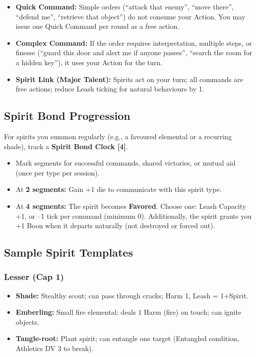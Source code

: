 \begin{itemize}
  \item \textbf{Quick Command:} Simple orders (``attack that enemy'', ``move there'', ``defend me'', ``retrieve that object'') do not consume your Action. You may issue one Quick Command per round as a free action.
  \item \textbf{Complex Command:} If the order requires interpretation, multiple steps, or finesse (``guard this door and alert me if anyone passes'', ``search the room for a hidden key''), it uses your Action for the turn.
  \item \textbf{Spirit Link (Major Talent):} Spirits act on your turn; all commands are free actions; reduce Leash ticking for natural behaviours by 1.
\end{itemize}

\subsection{Spirit Bond Progression}

For spirits you summon regularly (e.g., a favoured elemental or a recurring shade), track a \textbf{Spirit Bond Clock [4]}.

\begin{itemize}
  \item Mark segments for successful commands, shared victories, or mutual aid (once per type per session).
  \item At \textbf{2 segments:} Gain +1 die to communicate with this spirit type.
  \item At \textbf{4 segments:} The spirit becomes \textbf{Favored}. Choose one: Leash Capacity +1, or –1 tick per command (minimum 0). Additionally, the spirit grants you +1 Boon when it departs naturally (not destroyed or forced out).
\end{itemize}

\subsection{Sample Spirit Templates}

\subsubsection{Lesser (Cap 1)}

\begin{itemize}
  \item \textbf{Shade:} Stealthy scout; can pass through cracks; Harm 1, Leash = 1+Spirit.
  \item \textbf{Emberling:} Small fire elemental; deals 1 Harm (fire) on touch; can ignite objects.
  \item \textbf{Tangle-root:} Plant spirit; can entangle one target (Entangled condition, Athletics DV 3 to break).
\end{itemize}

